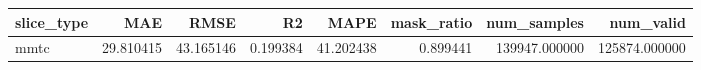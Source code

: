 \begin{tabular}{lrrrrrrr}
\toprule
slice_type & MAE & RMSE & R2 & MAPE & mask_ratio & num_samples & num_valid \\
\midrule
mmtc & 29.810415 & 43.165146 & 0.199384 & 41.202438 & 0.899441 & 139947.000000 & 125874.000000 \\
\bottomrule
\end{tabular}

